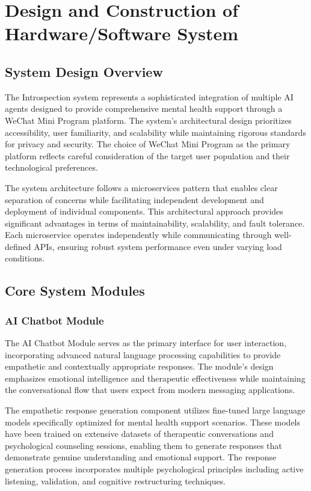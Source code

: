 \section{Design and Construction of Hardware/Software System}
\label{sec:design}

\subsection{System Design Overview}

The Introspection system represents a sophisticated integration of multiple AI agents designed to provide comprehensive mental health support through a WeChat Mini Program platform. The system's architectural design prioritizes accessibility, user familiarity, and scalability while maintaining rigorous standards for privacy and security. The choice of WeChat Mini Program as the primary platform reflects careful consideration of the target user population and their technological preferences.

The system architecture follows a microservices pattern that enables clear separation of concerns while facilitating independent development and deployment of individual components. This architectural approach provides significant advantages in terms of maintainability, scalability, and fault tolerance. Each microservice operates independently while communicating through well-defined APIs, ensuring robust system performance even under varying load conditions.

\subsection{Core System Modules}

\subsubsection{AI Chatbot Module}

The AI Chatbot Module serves as the primary interface for user interaction, incorporating advanced natural language processing capabilities to provide empathetic and contextually appropriate responses. The module's design emphasizes emotional intelligence and therapeutic effectiveness while maintaining the conversational flow that users expect from modern messaging applications.

The empathetic response generation component utilizes fine-tuned large language models specifically optimized for mental health support scenarios. These models have been trained on extensive datasets of therapeutic conversations and psychological counseling sessions, enabling them to generate responses that demonstrate genuine understanding and emotional support. The response generation process incorporates multiple psychological principles including active listening, validation, and cognitive restructuring techniques.

